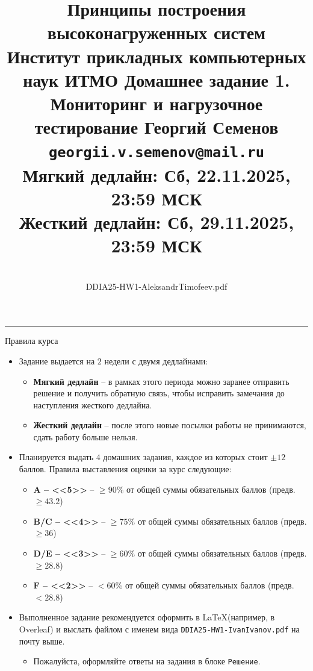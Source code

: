 \documentclass[12pt]{article}
\begin{document}
 
\title{
    \large Принципы построения высоконагруженных систем \\
    \normalsize Институт прикладных компьютерных наук ИТМО
    \bigbreak 
    \LARGE
    Домашнее задание 1. \\ Мониторинг и нагрузочное тестирование
    \bigbreak \normalsize
    Георгий Семенов \\
    \texttt{georgii.v.semenov@mail.ru} \\
    Мягкий дедлайн: Сб, 22.11.2025, 23:59 МСК \\
    Жесткий дедлайн: Сб, 29.11.2025, 23:59 МСК
}
\author{
    \color{red}{Александр Тимофеев} \\
    \normalsize
    DDIA25-HW1-{\color{red}AleksandrTimofeev}.pdf
}

\maketitle

\noindent\rule{\textwidth}{1pt} \bigbreak

{\large Правила курса}

\begin{itemize}
	\item Задание выдается на $2$ недели с двумя дедлайнами:
	      \begin{itemize}
	      	\item \textbf{Мягкий дедлайн} – в рамках этого периода можно заранее отправить решение
	      	      и получить обратную связь, чтобы исправить замечания до наступления жесткого дедлайна.
	      	\item \textbf{Жесткий дедлайн} – после этого новые посылки работы не принимаются, сдать работу больше нельзя.
	      \end{itemize}
	\item Планируется выдать $4$ домашних задания, каждое из которых стоит $\pm 12$ баллов. Правила выставления оценки за курс следующие:
	      \begin{itemize}
	      	\item \textbf{A -- <<5>>} – $\geq 90\%$ от общей суммы обязательных баллов (предв. $\geq 43.2$)
	      	\item \textbf{B/C -- <<4>>} – $\geq 75\%$ от общей суммы обязательных баллов (предв. $\geq 36$)
	      	\item \textbf{D/E -- <<3>>} – $\geq 60\%$ от общей суммы обязательных баллов (предв. $\geq 28.8$)
	      	\item \textbf{F -- <<2>>} – $< 60\%$ от общей суммы обязательных баллов (предв. $< 28.8$)
	      \end{itemize}
	\item Выполненное задание рекомендуется оформить в \LaTeX (например, в Overleaf) и выслать файлом с именем вида \texttt{DDIA25-HW1-IvanIvanov.pdf}
	      на почту выше.
	      \begin{itemize}
	      	\item Пожалуйста, оформляйте ответы на задания в блоке \texttt{Решение}.
	      \end{itemize}
\end{itemize}
\end{document}
